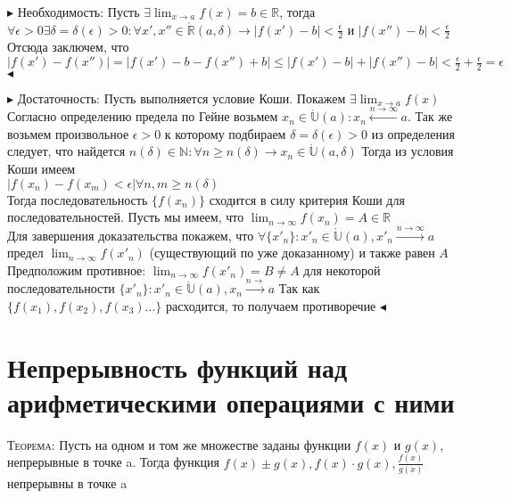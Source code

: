 \documentclass[14pt]{article}
\begin{document}
        $\blacktriangleright$
            Необходимость: Пусть $\exists \lim_{x\rightarrow a} f(x) = b \in \mathbb{R}$, тогда $\forall \epsilon > 0 \exists \delta = \delta(\epsilon) > 0 : \forall x', x'' \in \mathring{\mathbb{R}} (a, \delta) \rightarrow |f(x') - b| < \frac{\epsilon}{2}$ и $|f(x'')-b| < \frac{\epsilon}{2}$ \\
            Отсюда заключем, что \\
            $|f(x')-f(x'')| = |f(x')-b-f(x'')+b| \leqslant |f(x') - b| + |f(x'')-b| < \frac{\epsilon}{2} + \frac{\epsilon}{2} = \epsilon$  $\blacktriangleleft$
        
        $\blacktriangleright$ 
        Достаточность: Пусть выполняется условие Коши. Покажем $\exists \lim_{x\rightarrow a} f(x)$ Согласно определению предела по Гейне возьмем $x_n \in \mathring{\mathbb{U}}(a):x_n \xleftarrow{n \rightarrow \infty} a$. Так же возьмем произвольное $\epsilon > 0$ к которому подбираем $\delta = \delta(\epsilon) > 0$ из определения следует, что найдется $n(\delta)\in\mathbb{N}:\forall n \geqslant n(\delta) \rightarrow x_n \in \mathring{\mathbb{U}}(a, \delta)$ Тогда из условия Коши имеем \\
        $|f(x_n) - f(x_m) < \epsilon|   \forall n,m \geqslant n(\delta)$ \\ 
        Тогда последовательность $\{f(x_n)\}$ сходится в силу критерия Коши для последовательностей. Пусть мы имеем, что $\lim_{n\rightarrow\infty}f(x_n) = A \in \mathbb{R}$ \\ 
        Для завершения доказательства покажем, что $\forall \{x'_n\}:x'_n \in \mathring{\mathbb{U}}(a), x'_n \xrightarrow{n\rightarrow \infty}a$ предел $\lim_{n\rightarrow \infty} f(x'_n) $ (существующий по уже доказанному) и также равен $A$ \\ 
        Предположим противное: $\lim_{n\rightarrow\infty}f(x'_n) = B \ne A$ для некоторой последовательности $\{x'_n\}:x'_n \in \mathring{\mathbb{U}}(a), x_n \xrightarrow{n\rightarrow}a$ Так как $\{f(x_1),f(x_2),f(x_3)...\}$ расходится, то получаем противоречие
        $\blacktriangleleft$\\
    \section{Непрерывность функций над арифметическими операциями с ними}
        \textsc{Теорема:} Пусть на одном и том же множестве заданы функции $f(x)$ и $g(x)$, непрерывные в точке a. Тогда функция $f(x) \pm g(x), f(x) \cdot g(x), \frac{f(x)}{g(x)}$ непрерывны в точке a
        
\end{document}

